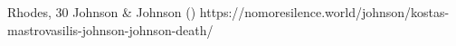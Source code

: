           {Rhodes, }
          {30}
          {Johnson \& Johnson}
          {}
          {
             ()
          }
          {https://nomoresilence.world/johnson/kostas-mastrovasilis-johnson-johnson-death/}
